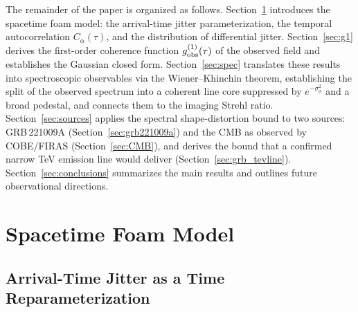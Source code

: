 \documentclass[aps,prd,onecolumn,amsmath,amssymb]{revtex4-2}
\begin{document}
The remainder of the paper is organized as follows.
Section~\ref{sec:model} introduces the spacetime foam model: the
arrival-time jitter parameterization, the temporal autocorrelation
$C_\alpha(\tau)$, and the distribution of differential jitter.
Section~\ref{sec:g1} derives the first-order coherence function
$g^{(1)}_{\rm obs}(\tau)$ of the observed field and establishes the
Gaussian closed form.
Section~\ref{sec:spec} translates these results into spectroscopic observables
via the Wiener--Khinchin theorem, establishing the split of the observed
spectrum into a coherent line core suppressed by $e^{-\sigma_\phi^2}$ and a
broad pedestal, and connects them to the imaging Strehl ratio.
Section~\ref{sec:sources} applies the spectral shape-distortion bound to two sources:
GRB\,221009A (Section~\ref{sec:grb221009a}) and the CMB as observed by
COBE/FIRAS (Section~\ref{sec:CMB}), and derives the bound that a
confirmed narrow TeV emission line would deliver
(Section~\ref{sec:grb_tevline}).
Section~\ref{sec:conclusions} summarizes the main results and outlines future
observational directions.

\section{Spacetime Foam Model}
\label{sec:model}

\subsection{Arrival-Time Jitter as a Time Reparameterization}
\end{document}

